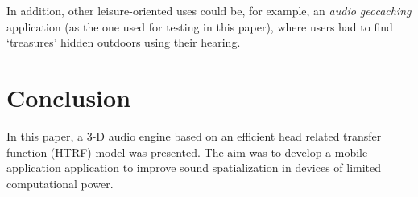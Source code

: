 \documentclass[journal]{IEEEtran}
\begin{document}
In addition, other leisure-oriented uses could be, for example, an \textit{audio geocaching} application (as the one used for testing in this paper), where users had to find `treasures' hidden outdoors using their hearing.


%
%







\section{Conclusion}


In this paper, a 3-D audio engine based on an efficient head related transfer function (HTRF) model was presented. The aim was to develop a mobile application application to improve sound spatialization in devices of limited computational power.
\end{document}
